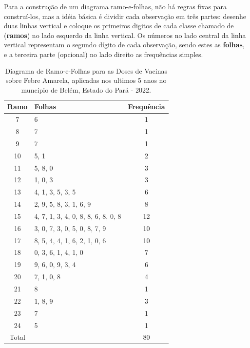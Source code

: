 Para a construção de um diagrama ramo-e-folhas, não há regras fixas para construí-los, mas a idéia básica é dividir cada observação em três partes: desenhe duas linhas vertical e coloque os primeiros digitos de cada classe chamado de (\textbf{ramos}) no lado esquerdo da linha vertical. Os números no lado central da linha vertical representam o segundo dígito de cada observação, sendo estes as \textbf{folhas}, e a terceira parte (opcional) no lado direito as frequências  simples.\vskip0.3cm

\begin{table}[!htb]
    \centering
    {
    \caption{Diagrama de Ramo-e-Folhas para as Doses de Vacinas sobre Febre Amarela, aplicadas nos ultimos 5 anos no muncípio de Belém, Estado do Pará - 2022.}
    \label{ramosfolhas}
    \vspace{0.1cm}
\begin{tabular}{c|l|c}
\hline \hline
\textbf{Ramo} & \textbf{Folhas} & \textbf{Frequência} \\
\hline \hline 
 7  &  6                                   & 1  \\
 8  &  7                                   & 1  \\
 9  &  7                                   & 1  \\
 10 &  5, 1                                & 2  \\
 11 &  5, 8, 0                             & 3  \\
 12 &  1, 0, 3                             & 3  \\
 13 &  4, 1, 3, 5, 3, 5                    & 6  \\
 14 &  2, 9, 5, 8, 3, 1, 6, 9              & 8  \\
 15 &  4, 7, 1, 3, 4, 0, 8, 8, 6, 8, 0, 8  & 12 \\
 16 &  3, 0, 7, 3, 0, 5, 0, 8, 7, 9        & 10 \\
 17 &  8, 5, 4, 4, 1, 6, 2, 1, 0, 6        & 10 \\
 18 &  0, 3, 6, 1, 4, 1, 0                 & 7  \\
 19 &  9, 6, 0, 9, 3, 4                    & 6  \\
 20 &  7, 1, 0, 8                          & 4  \\
 21 &  8                                   & 1  \\
 22 &  1, 8, 9                             & 3  \\
 23 &  7                                   & 1  \\
 24 &  5                                   & 1  \\
 \hline
 Total   &                                 & 80 \\ 
 \hline \hline
\end{tabular}}
\end{table}

